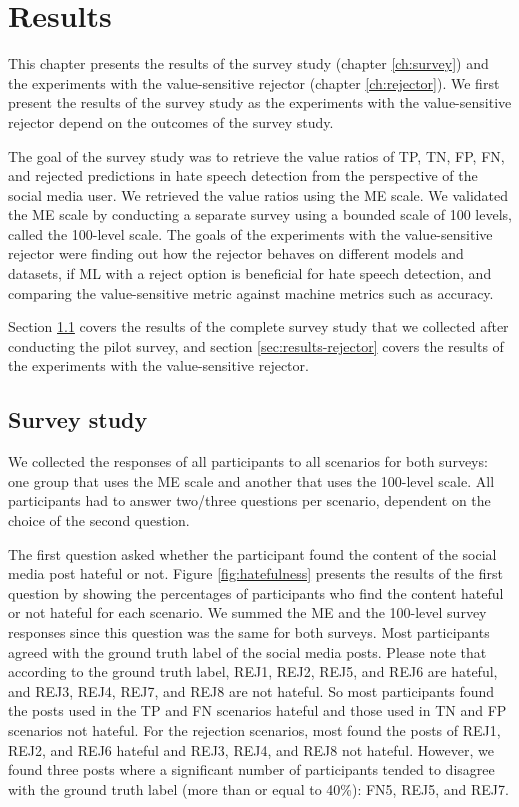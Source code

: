 \chapter{Results}
\label{ch:results}
This chapter presents the results of the survey study (chapter \ref{ch:survey}) and the experiments with the value-sensitive rejector (chapter \ref{ch:rejector}).
%
We first present the results of the survey study as the experiments with the value-sensitive rejector depend on the outcomes of the survey study.
%

%
The goal of the survey study was to retrieve the value ratios of TP, TN, FP, FN, and rejected predictions in hate speech detection from the perspective of the social media user.
%
We retrieved the value ratios using the ME scale.
%
We validated the ME scale by conducting a separate survey using a bounded scale of 100 levels, called the 100-level scale.
%
The goals of the experiments with the value-sensitive rejector were finding out how the rejector behaves on different models and datasets, if ML with a reject option is beneficial for hate speech detection, and comparing the value-sensitive metric against machine metrics such as accuracy.
%

%
Section \ref{sec:results-survey-study} covers the results of the complete survey study that we collected after conducting the pilot survey, and section \ref{sec:results-rejector} covers the results of the experiments with the value-sensitive rejector.

\section{Survey study}
\label{sec:results-survey-study}
We collected the responses of all participants to all scenarios for both surveys: one group that uses the ME scale and another that uses the 100-level scale.
%
All participants had to answer two/three questions per scenario, dependent on the choice of the second question.
%

%
The first question asked whether the participant found the content of the social media post hateful or not.
%
Figure \ref{fig:hatefulness} presents the results of the first question by showing the percentages of participants who find the content hateful or not hateful for each scenario.
%
We summed the ME and the 100-level survey responses since this question was the same for both surveys.
%
Most participants agreed with the ground truth label of the social media posts.
%
Please note that according to the ground truth label, REJ1, REJ2, REJ5, and REJ6 are hateful, and REJ3, REJ4, REJ7, and REJ8 are not hateful.
%
So most participants found the posts used in the TP and FN scenarios hateful and those used in TN and FP scenarios not hateful.
%
For the rejection scenarios, most found the posts of REJ1, REJ2, and REJ6 hateful and REJ3, REJ4, and REJ8 not hateful.
%
However, we found three posts where a significant number of participants tended to disagree with the ground truth label (more than or equal to 40\%): FN5, REJ5, and REJ7.
%

